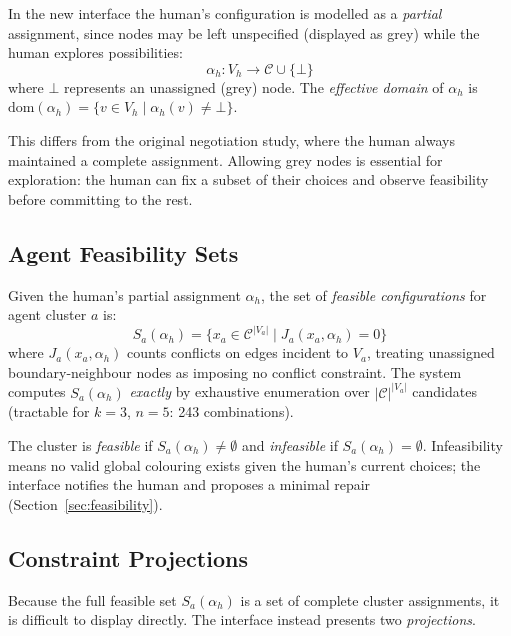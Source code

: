 \documentclass[10pt]{article}
\theoremstyle{definition}
\begin{document}
In the new interface the human's configuration is modelled as a \emph{partial} assignment, since
nodes may be left unspecified (displayed as grey) while the human explores possibilities:
\begin{equation}
  \alpha_h : V_h \to \mathcal{C} \cup \{\bot\}
  \label{eq:partial}
\end{equation}
where $\bot$ represents an unassigned (grey) node.  The \emph{effective domain} of $\alpha_h$
is $\mathrm{dom}(\alpha_h) = \{v \in V_h \mid \alpha_h(v) \neq \bot\}$.

This differs from the original negotiation study, where the human always maintained a complete
assignment.  Allowing grey nodes is essential for exploration: the human can fix a subset of their
choices and observe feasibility before committing to the rest.

\subsection{Agent Feasibility Sets}

Given the human's partial assignment $\alpha_h$, the set of \emph{feasible configurations} for
agent cluster $a$ is:
\begin{equation}
  S_a(\alpha_h) = \bigl\{ x_a \in \mathcal{C}^{|V_a|}
    \;\big|\; J_a(x_a, \alpha_h) = 0 \bigr\}
  \label{eq:feasible}
\end{equation}
where $J_a(x_a, \alpha_h)$ counts conflicts on edges incident to $V_a$, treating unassigned
boundary-neighbour nodes as imposing no conflict constraint.  The system computes $S_a(\alpha_h)$
\emph{exactly} by exhaustive enumeration over $|\mathcal{C}|^{|V_a|}$ candidates (tractable for
$k=3$, $n=5$: 243 combinations).

The cluster is \emph{feasible} if $S_a(\alpha_h) \neq \emptyset$ and \emph{infeasible} if
$S_a(\alpha_h) = \emptyset$.  Infeasibility means no valid global colouring exists given the
human's current choices; the interface notifies the human and proposes a minimal repair
(Section~\ref{sec:feasibility}).

\subsection{Constraint Projections}

Because the full feasible set $S_a(\alpha_h)$ is a set of complete cluster assignments, it is
difficult to display directly.  The interface instead presents two \emph{projections}.
\end{document}
